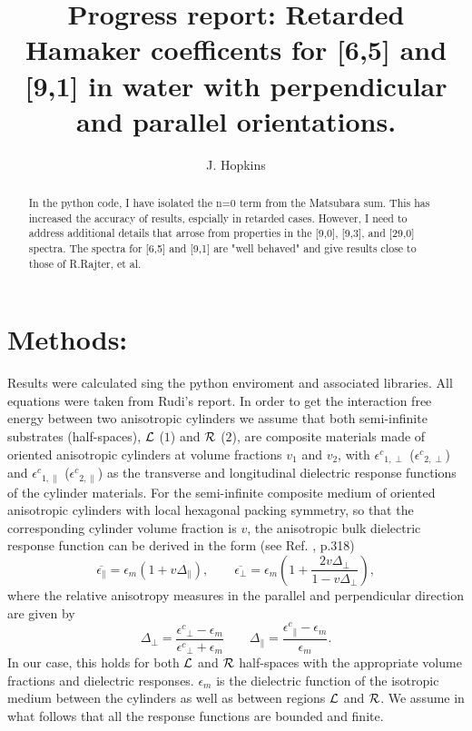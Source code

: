 \documentclass[onecolumn,letterpaper,amsmath,amssymb,floatfix,aps,superscriptaddress]{revtex4}
\begin{document}
\title{\bf Progress report: Retarded Hamaker coefficents for [6,5] and [9,1] in water with
perpendicular and parallel orientations.}  

\author{J. Hopkins}
    
\begin{abstract}
In the python code, I have isolated the n=0 term from the Matsubara sum. This
has increased the accuracy of results, espcially in retarded cases.  However, I
need to address additional details that arrose from properties in the [9,0],
[9,3], and [29,0] spectra.  The spectra for [6,5] and [9,1] are "well behaved"
and give results close to those of R.Rajter, et al.
\end{abstract}

\maketitle        

\section{Methods:}
Results were calculated sing the python enviroment and associated libraries. All
equations were taken from Rudi's report. 
In order to get the interaction free energy between two anisotropic cylinders we assume that both semi-infinite substrates (half-spaces), ${\cal L}$ ($1$) and ${\cal R}$ ($2$), are 
composite materials made of oriented anisotropic cylinders at volume fractions $v_1$ and $v_2$, with ${\epsilon^{c}}_{1,\perp}$ (${\epsilon^{c}}_{2,\perp}$) 
and ${\epsilon^{c}}_{1,\parallel}$ (${\epsilon^{c}}_{2,\parallel}$) as the transverse and longitudinal
dielectric response functions of the cylinder materials. For the semi-infinite composite medium of oriented anisotropic cylinders with local hexagonal  packing symmetry, so that the corresponding cylinder volume fraction is $v$, the anisotropic bulk dielectric response function can be derived in the
form (see Ref. , p.318) 
\begin{equation}
\overline{\epsilon_{\parallel}}=\epsilon_{m}\left(1+v\Delta_{\parallel}\right),\qquad\overline{\epsilon_{\perp}}=\epsilon_{m}\left(1+\frac{2v\Delta_{\perp}}{1-v\Delta_{\perp}}\right),\label{eq:v_dependance}
\end{equation}
where the relative anisotropy measures in the parallel and perpendicular direction are given by
\begin{equation}
\Delta_{\perp}=\frac{{\epsilon^{c}}_{\perp}-\epsilon_{m}}{{\epsilon^{c}}_{\perp}+\epsilon_{m}}\qquad\Delta_{\parallel}=\frac{{\epsilon^{c}}_{\parallel}-\epsilon_{m}}{\epsilon_{m}}.
\label{anisoind}
\end{equation}
In our case, this holds for both ${\cal L}$ and ${\cal R}$ half-spaces with the appropriate volume fractions and dielectric responses. $\epsilon_{m}$ is the dielectric function of the 
isotropic medium between the cylinders as well as between regions ${\cal L}$ and ${\cal R}$. We assume in what follows that all the response functions are bounded and finite.
 
\end{document}
